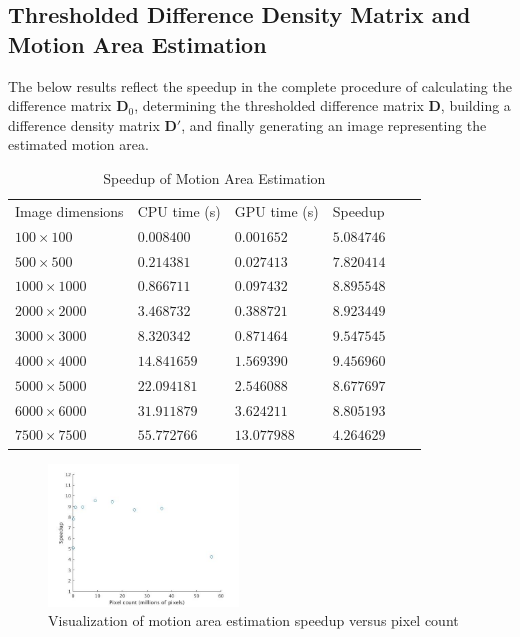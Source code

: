 \documentclass[journal]{IEEEtran}
\begin{document}
\subsection{Thresholded Difference Density Matrix and Motion Area Estimation}
The below results reflect the speedup in the complete procedure of calculating the difference matrix $\boldsymbol{D}_0$, determining the thresholded difference matrix $\boldsymbol{D}$, building a difference density matrix $\boldsymbol{D}'$, and finally generating an image representing the estimated motion area.
\begin{table}[H]
	\small
	\centering
	\caption{Speedup of Motion Area Estimation}
	\label{motion-area-speedup}
	\begin{tabular}{llllll}
	 Image dimensions & CPU time (s) & GPU time (s) & Speedup \\
	 $100 \times 100$ & $0.008400$ & $0.001652$ & $5.084746$ \\
	 $500 \times 500$ & $0.214381$ & $0.027413$ & $7.820414$ \\
	 $1000 \times 1000$ & $0.866711$ & $0.097432$ & $8.895548$ \\
	 $2000 \times 2000$ & $3.468732$ & $0.388721$ & $8.923449$ \\
	 $3000 \times 3000$ & $8.320342$ & $0.871464$ & $9.547545$ \\
	 $4000 \times 4000$ & $14.841659$ & $1.569390$ & $9.456960$ \\
	 $5000 \times 5000$ & $22.094181$ & $2.546088$ & $8.677697$ \\
	 $6000 \times 6000$ & $31.911879$ & $3.624211$ & $8.805193$ \\
	 $7500 \times 7500$ & $55.772766$ & $13.077988$ & $4.264629$ \\
	\end{tabular}
\end{table}
\begin{figure}[h]
	\centering
	\includegraphics[width=0.45\textwidth]{motion_area_estimation_speedup_graph.jpg}
	\caption{Visualization of motion area estimation speedup versus pixel count}
    \label{motion-area-estimation-speedup-graph}
\end{figure}
\end{document}
